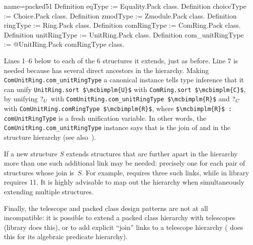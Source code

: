 \begin{coq}{name=packed51}{}
Definition eqType := Equality.Pack class.
Definition choiceType := Choice.Pack class.
Definition zmodType := Zmodule.Pack class.
Definition ringType := Ring.Pack class.
Definition comRingType := ComRing.Pack class.
Definition unitRingType := UnitRing.Pack class.
Definition com_unitRingType := @UnitRing.Pack comRingType class.
\end{coq}

Lines 1--6 below  to each of the 6 structures it
extends, just as before. Line 7 is needed because 
has several direct ancestors in the hierarchy.  Making
\lstinline/ComUnitRing.com_unitRingType/ a canonical 
instance tells type inference that it can unify
\lstinline/UnitRing.sort $\mcbimplm{U}$/ with
\lstinline/ComRing.sort $\mcbimplm{C}$/, by unifying $\mbox{?}_{U}$ with
\lstinline/ComUnitRing.com_unitRingType $\mcbimplm{R}$/ and
$\mbox{?}_{C}$ with
\lstinline/ComUnitRing.comRingType $\mcbimplm{R}$/,
where \lstinline/$\mcbimplm{R}$ : comUnitRingType/
is a fresh unification variable.
In other words, the \lstinline/ComUnitRing.com_unitRingType/ instance
says that  is the join of
 and  in the structure hierarchy (see
also~\cite[Section 5]{mahboubi:hal-00816703}).

If a new structure $S$ extends structures that are further apart in
the hierarchy more than one such additional link may be needed:
precisely one for each pair of structures whose join is~$S$. For example,
 requires three such links, while
 in library  requires 11. It is highly
advisable to map out the hierarchy when simultaneously extending
multiple structures.

Finally, the telescope and packed class design patterns are not
at all incompatible: it is possible to extend a packed class
hierarchy with telescopes (library  does this), or to add
explicit ``join'' links to a telescope hierarchy ( does this
for its algebraic predicate hierarchy).

\label{sec:phant}


